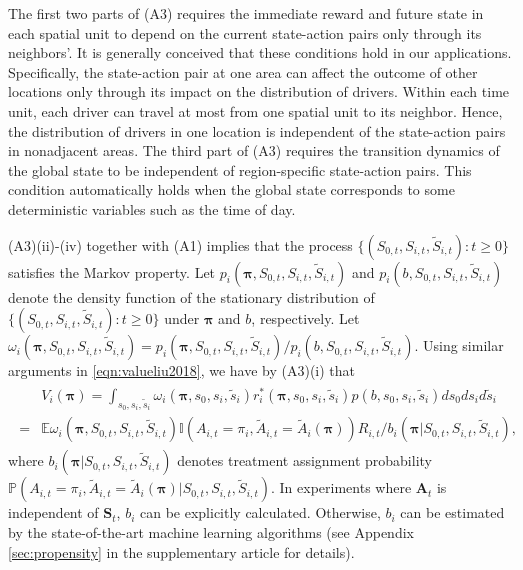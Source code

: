 \documentclass{article}
\newcommand{\Mean}{{\mathbb{E}}}
\newcommand{\prob}{{\mathbb{P}}}
\begin{document}
The first two parts of (A3) requires the immediate reward and future state in each spatial unit to depend on the current state-action pairs only through its neighbors'. It is generally conceived that these conditions hold in our applications. Specifically, the state-action pair at one area can affect the outcome of other locations only through its impact on the distribution of drivers. Within each time unit, each driver can travel at most from one spatial unit to its neighbor. Hence, the distribution of drivers in one location is independent of the state-action pairs in nonadjacent areas. The third part of (A3) requires the transition dynamics of the global state to be independent of region-specific state-action pairs. This condition automatically holds when the global state corresponds to some deterministic variables such as the time of day. 

(A3)(ii)-(iv) together with (A1) implies that the process $\{(S_{0,t},S_{i,t},\widetilde{S}_{i,t}):t\ge 0\}$ satisfies the Markov property. Let $p_i(\bm{\pi},S_{0,t},S_{i,t},\widetilde{S}_{i,t})$ and $p_i(b,S_{0,t},S_{i,t},\widetilde{S}_{i,t})$ denote the density function of the stationary distribution of $\{(S_{0,t},S_{i,t},\widetilde{S}_{i,t}):t\ge 0\}$ under $\bm{\pi}$ and $b$, respectively. Let $\omega_i(\bm{\pi},S_{0,t},S_{i,t},\widetilde{S}_{i,t})=p_i(\bm{\pi},S_{0,t},S_{i,t},\widetilde{S}_{i,t})/p_i(b,S_{0,t},S_{i,t},\widetilde{S}_{i,t})$. Using similar arguments in \eqref{eqn:valueliu2018}, we have by (A3)(i) that 
\begin{eqnarray}\label{eqn:value}
\begin{split}
	&V_i(\bm{\pi})=\int_{s_0,s_i,\tilde{s}_i} \omega_i(\bm{\pi},s_0,s_i,\tilde{s}_i)r_i^*(\bm{\pi},s_0,s_i,\tilde{s}_i)p(b,s_0,s_i,\tilde{s}_i)ds_0ds_id\tilde{s}_i\\
	=&\Mean \omega_i(\bm{\pi},S_{0,t},S_{i,t},\tilde{S}_{i,t})\mathbb{I}(A_{i,t}=\pi_i,\widetilde{A}_{i,t}=\widetilde{A}_i(\bm{\pi}))R_{i,t}/b_i(\bm{\pi}|S_{0,t},S_{i,t},\widetilde{S}_{i,t}),
\end{split}	
\end{eqnarray}
where $b_i(\bm{\pi}|S_{0,t},S_{i,t},\widetilde{S}_{i,t})$ denotes treatment assignment probability $\prob(A_{i,t}=\pi_i,\widetilde{A}_{i,t}=\widetilde{A}_i(\bm{\pi})|S_{0,t},S_{i,t},\tilde{S}_{i,t})$. In experiments where $\bm{A}_t$ is independent of $\bm{S}_t$, $b_i$ can be explicitly calculated. Otherwise, $b_i$ can be estimated by the state-of-the-art machine learning algorithms (see Appendix \ref{sec:propensity} in the supplementary article for details). 
\end{document}
